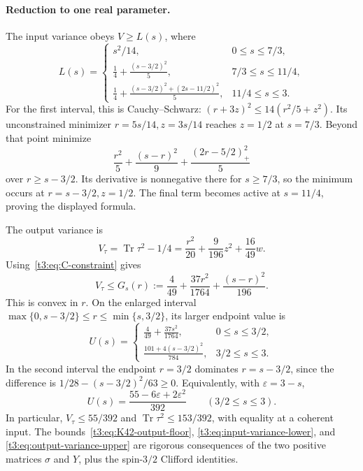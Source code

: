 \documentclass[11pt,a4paper]{article}
\begin{document}
\paragraph{Reduction to one real parameter.}
The input variance obeys $V\ge L(s)$, where
\begin{equation}\label{t3:eq:input-variance-lower}
 L(s)=\begin{cases}
 s^2/14,&0\le s\le7/3,\\[2pt]
 \displaystyle\frac14+\frac{(s-3/2)^2}{5},&7/3\le s\le11/4,\\[5pt]
 \displaystyle\frac14+\frac{(s-3/2)^2+(2s-11/2)^2}{5},&11/4\le s\le3.
 \end{cases}
\end{equation}
For the first interval, this is Cauchy--Schwarz:
$(r+3z)^2\le14(r^2/5+z^2)$. Its unconstrained minimizer
$r=5s/14,z=3s/14$ reaches $z=1/2$ at $s=7/3$.
Beyond that point minimize
\[
 \frac{r^2}{5}+\frac{(s-r)^2}{9}
       +\frac{(2r-5/2)_+^2}{5}
\]
over $r\ge s-3/2$. Its derivative is nonnegative there for $s\ge7/3$,
so the minimum occurs at $r=s-3/2,z=1/2$. The final term becomes active
at $s=11/4$, proving the displayed formula.

The output variance is
\[
 V_\tau=\operatorname{Tr}\tau^2-1/4
 =\frac{r^2}{20}+\frac9{196}z^2+\frac{16}{49}w.
\]
Using~\eqref{t3:eq:C-constraint} gives
\[
 V_\tau\le G_s(r):=\frac4{49}+\frac{37r^2}{1764}
                        +\frac{(s-r)^2}{196}.
\]
This is convex in $r$. On the enlarged interval
$\max\{0,s-3/2\}\le r\le\min\{s,3/2\}$, its larger endpoint value is
\begin{equation}\label{t3:eq:output-variance-upper}
 U(s)=\begin{cases}
 \displaystyle\frac4{49}+\frac{37s^2}{1764},&0\le s\le3/2,\\[5pt]
 \displaystyle\frac{101+4(s-3/2)^2}{784},&3/2\le s\le3.
 \end{cases}
\end{equation}
In the second interval the endpoint $r=3/2$ dominates $r=s-3/2$, since
the difference is $1/28-(s-3/2)^2/63\ge0$.
Equivalently, with $\varepsilon=3-s$,
\[
 U(s)=\frac{55-6\varepsilon+2\varepsilon^2}{392}
 \qquad(3/2\le s\le3).
\]
In particular, $V_\tau\le55/392$ and
$\operatorname{Tr}\tau^2\le153/392$, with equality at a coherent input.
The bounds~\eqref{t3:eq:K42-output-floor}, \eqref{t3:eq:input-variance-lower}, and
\eqref{t3:eq:output-variance-upper} are rigorous consequences of the two
positive matrices $\sigma$ and $Y$, plus the spin-$3/2$ Clifford identities.
\end{document}
